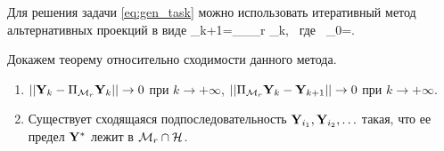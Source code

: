 \documentclass[12pt,a4paper,fleqn,leqno]{article}
\begin{document}
Для решения задачи \eqref{eq:gen_task} можно использовать итеративный метод альтернативных проекций в виде
\be
   \bfY_{k+1}=\Pi_\calH \Pi_{\calM_r} \bfY_{k}, \mbox{\ где\ } \bfY_{0}=\bfX.
\ee

Докажем теорему относительно сходимости данного метода.

\begin{theorem}
\label{th:converg}
\begin{enumerate}
Пусть пространство $\calM_r$ является замкнутым в топологии, порождаемой нормой $\|\cdot\|$. Тогда
\item $||\mathbf{Y}_k - \Pi_{\mathcal{M}_r}\mathbf{Y}_k|| \to 0$ при $k \to +\infty$, $||\Pi_{\mathcal{M}_r}\mathbf{Y}_k - \mathbf{Y}_{k+1}|| \to 0$ при $k \to +\infty$.
\item Существует сходящаяся подпоследовательность $\mathbf{Y}_{i_1}, \mathbf{Y}_{i_2}, \ldots$ такая, что ее предел $\mathbf{Y}^*$ лежит в $\mathcal{M}_r \cap \mathcal{H}$.
\end{enumerate}
\end{theorem}
\end{document}

